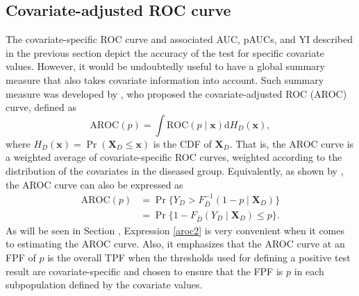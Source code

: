 \subsection{Covariate-adjusted ROC curve}\label{sec:aroc}
The covariate-specific ROC curve and associated AUC, pAUCs, and YI described in the previous section depict the accuracy of the test for specific covariate values. However, it would be undoubtedly useful to have a global summary measure that also takes covariate information into account. Such summary measure was developed by \cite{Janes09a}, who proposed the covariate-adjusted ROC (AROC) curve, defined as
\begin{equation}
\text{AROC}(p)=\int \text{ROC}(p\mid\mathbf{x})\text{d}H_{D}(\mathbf{x}),
\label{aroc1}
\end{equation}
where $H_{D}(\mathbf{x}) = \Pr(\mathbf{X}_{D}\leq \mathbf{x})$ is the CDF of $\mathbf{X}_{D}$. That is, the AROC curve is a weighted average of covariate-specific ROC curves, weighted according to the distribution of the covariates in the diseased group. Equivalently, as shown by \cite{Janes09a}, the AROC curve can also be expressed as
\begin{align}\label{aroc2}
\text{AROC}(p) & = \Pr\{Y_{D}>F_{\bar{D}}^{-1}(1-p\mid \mathbf{X}_{D})\} \nonumber \\
& = \Pr\{1-F_{\bar{D}}(Y_D\mid\mathbf{X}_{D})\leq p\}.
\end{align}
As will be seen in Section , Expression \eqref{aroc2} is very convenient when it comes to estimating the AROC curve. Also, it emphasizes that the AROC curve at an FPF of $p$ is the overall TPF when the thresholds used for defining a positive test result are covariate-specific and chosen to ensure that the FPF is $p$ in each subpopulation defined by the covariate values.

